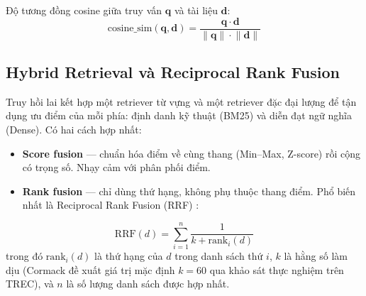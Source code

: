Độ tương đồng cosine giữa truy vấn $\mathbf{q}$ và tài liệu $\mathbf{d}$:
\begin{equation}
\mathrm{cosine\_sim}(\mathbf{q}, \mathbf{d}) = \frac{\mathbf{q} \cdot \mathbf{d}}{\lVert \mathbf{q} \rVert \cdot \lVert \mathbf{d} \rVert}
\end{equation}

\subsection{Hybrid Retrieval và Reciprocal Rank Fusion}
\label{subsec:hybrid}

Truy hồi lai kết hợp một retriever từ vựng và một retriever đặc đại lượng để tận dụng ưu điểm của mỗi phía: định danh kỹ thuật (BM25) và diễn đạt ngữ nghĩa (Dense). Có hai cách hợp nhất:
\begin{itemize}
  \item \textbf{Score fusion} --- chuẩn hóa điểm về cùng thang (Min--Max, Z-score) rồi cộng có trọng số. Nhạy cảm với phân phối điểm.
  \item \textbf{Rank fusion} --- chỉ dùng thứ hạng, không phụ thuộc thang điểm. Phổ biến nhất là Reciprocal Rank Fusion (RRF) \cite{cormack2009rrf}:
\end{itemize}
\begin{equation}
\mathrm{RRF}(d) = \sum_{i=1}^{n} \frac{1}{k + \mathrm{rank}_i(d)}
\end{equation}
trong đó $\mathrm{rank}_i(d)$ là thứ hạng của $d$ trong danh sách thứ $i$, $k$ là hằng số làm dịu (Cormack đề xuất giá trị mặc định $k = 60$ qua khảo sát thực nghiệm trên TREC), và $n$ là số lượng danh sách được hợp nhất.

